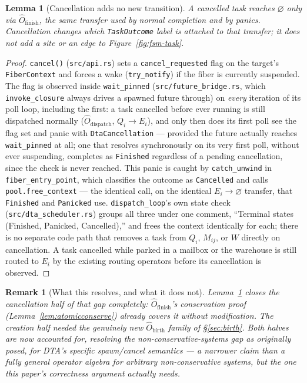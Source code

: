 \documentclass[11pt,a4paper]{report}
\newtheorem{lemma}[theorem]{Lemma}
\newtheorem{remark}{Remark}[section]
\newcommand{\code}[1]{\texttt{#1}}
\newcommand{\dtact}{\textsc{DTA}}
\begin{document}
\begin{lemma}[Cancellation adds no new transition]
\label{lem:cancel-no-new-op}
A cancelled task reaches $\varnothing$ only via $\hat{O}_{\text{finish}}$,
the same transfer used by normal completion and by panics. Cancellation
changes which \code{TaskOutcome} label is attached to that transfer; it
does not add a site or an edge to Figure~\ref{fig:fsm-task}.
\end{lemma}

\begin{proof}
\code{cancel()} (\code{src/api.rs}) sets a \code{cancel\_requested}
flag on the target's \code{FiberContext} and forces a wake
(\code{try\_notify}) if the fiber is currently suspended. The flag is
observed inside \code{wait\_pinned} (\code{src/future\_bridge.rs},
which \code{invoke\_closure} always drives a spawned future through)
on \emph{every} iteration of its poll loop, including the first:
a task cancelled before ever running is still dispatched normally
($\hat{O}_{\text{dispatch}}$, $Q_i \to E_i$), and only then does its
first poll see the flag set and panic with \code{DtaCancellation} ---
provided the future actually reaches \code{wait\_pinned} at all; one
that resolves synchronously on its very first poll, without ever
suspending, completes as \code{Finished} regardless of a pending
cancellation, since the check is never reached. This
panic is caught by \code{catch\_unwind} in \code{fiber\_entry\_point},
which classifies the outcome as \code{Cancelled} and calls
\code{pool.free\_context} --- the identical call, on the identical
$E_i \to \varnothing$ transfer, that \code{Finished} and \code{Panicked}
use. \code{dispatch\_loop}'s own state check
(\code{src/dta\_scheduler.rs}) groups all three under one comment,
``Terminal states (Finished, Panicked, Cancelled),'' and frees the
context identically for each; there is no separate code path that
removes a task from $Q_i$, $M_{ij}$, or $W$ directly on cancellation.
A task cancelled while parked in a mailbox or the warehouse is still
routed to $E_i$ by the existing routing operators before its
cancellation is observed.
\end{proof}

\begin{remark}[What this resolves, and what it does not]
Lemma~\ref{lem:cancel-no-new-op} closes the cancellation half of that
gap completely: $\hat{O}_{\text{finish}}$'s conservation proof
(Lemma~\ref{lem:atomicconserve}) already covers it without
modification. The creation half needed the genuinely new
$\hat{O}_{\text{birth}}$ family of \S\ref{sec:birth}. Both halves are
now accounted for, resolving the non-conservative-systems gap as
originally posed, for \dtact{}'s specific spawn/cancel semantics ---
a narrower claim than a fully general operator algebra for arbitrary
non-conservative systems, but the one this paper's correctness
argument actually needs.
\end{remark}
\end{document}
